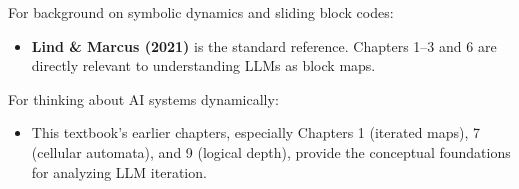 For background on symbolic dynamics and sliding block codes:

\begin{itemize}
\item \textbf{Lind \& Marcus (2021)} is the standard reference. Chapters 1--3 and 6 are directly relevant to understanding LLMs as block maps.
\end{itemize}

For thinking about AI systems dynamically:

\begin{itemize}
\item This textbook's earlier chapters, especially Chapters 1 (iterated maps), 7 (cellular automata), and 9 (logical depth), provide the conceptual foundations for analyzing LLM iteration.
\end{itemize}
